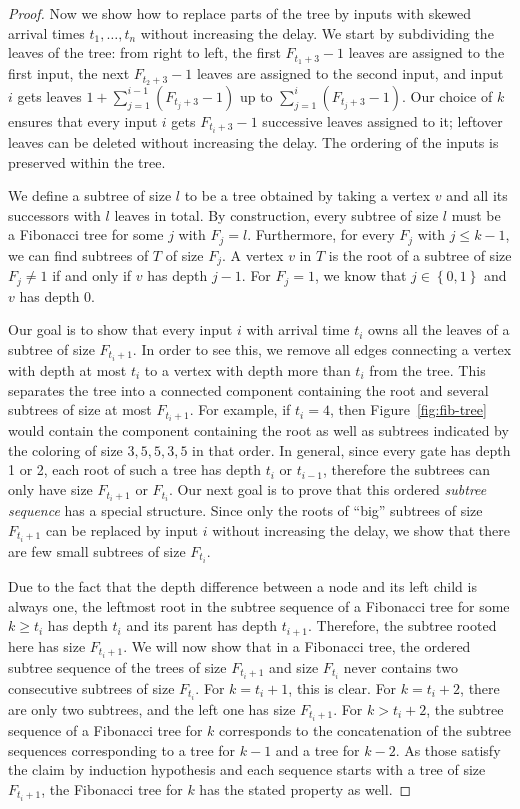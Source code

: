 \documentclass[11pt,final,microtype]{scrartcl}
\theoremstyle{plain}
\theoremstyle{definition}
\theoremstyle{remark}
\newcommand{\sset}[1]{\left\{#1\right\}}
\begin{document}
\begin{proof}
  Now we show how to replace parts of the tree by inputs with skewed
  arrival times $t_1, \dots, t_n$ without increasing the delay. We
  start by subdividing the leaves of the tree: from right to left, the
  first $F_{t_1+3}-1$ leaves are assigned to the first input, the next
  $F_{t_2+3}-1$ leaves are assigned to the second input, and input $i$
  gets leaves $1+\sum_{j=1}^{i-1} (F_{t_j+3} -1)$ up to $\sum_{j=1}^i
  (F_{t_j +3} -1)$. Our choice of $k$ ensures that every input $i$
  gets $F_{t_i +3}-1$ successive leaves assigned to it; leftover
  leaves can be deleted without increasing the delay. The ordering of
  the inputs is preserved within the tree.

  We define a subtree of size $l$ to be a tree obtained by taking a
  vertex $v$ and all its successors with $l$ leaves in total. By
  construction, every subtree of size $l$ must be a Fibonacci tree for
  some $j$ with $F_j = l$. Furthermore, for every $F_j$ with $j \leq
  k-1$, we can find subtrees of $T$ of size $F_j$. A vertex $v$ in $T$
  is the root of a subtree of size $F_j \neq 1$ if and only if $v$ has
  depth $j-1$. For $F_j = 1$, we know that $j \in \sset{0,1}$ and $v$
  has depth $0$.

  Our goal is to show that every input $i$ with arrival time $t_i$
  owns all the leaves of a subtree of size $F_{t_i+1}$. In order to
  see this, we remove all edges connecting a vertex with depth at most
  $t_i$ to a vertex with depth more than $t_i$ from the tree. This
  separates the tree into a connected component containing the root
  and several subtrees of size at most $F_{t_i+1}$. For example, if
  $t_i = 4$, then Figure~\ref{fig:fib-tree} would contain the
  component containing the root as well as subtrees indicated by the
  coloring of size $3,5,5,3,5$ in that order. In general, since every
  gate has depth 1 or 2, each root of such a tree has depth $t_i$ or
  $t_{i-1}$, therefore the subtrees can only have size $F_{t_i + 1}$
  or $F_{t_i}$. Our next goal is to prove that this ordered
  \emph{subtree sequence} has a special structure. Since only the
  roots of ``big'' subtrees of size $F_{t_i+1}$ can be replaced by
  input $i$ without increasing the delay, we show that there are few
  small subtrees of size $F_{t_i}$.

  Due to the fact that the depth difference between a node and its
  left child is always one, the leftmost root in the subtree sequence
  of a Fibonacci tree for some $k \geq t_i$ has depth $t_i$ and its
  parent has depth $t_{i+1}$. Therefore, the subtree rooted here has
  size $F_{t_i+1}$. We will now show that in a Fibonacci tree, the
  ordered subtree sequence of the trees of size $F_{t_i+1}$ and size
  $F_{t_i}$ never contains two consecutive subtrees of size
  $F_{t_i}$. For $k = t_i + 1$, this is clear. For $k = t_i + 2$,
  there are only two subtrees, and the left one has size
  $F_{t_i+1}$. For $k>t_i + 2$, the subtree sequence of a Fibonacci
  tree for $k$ corresponds to the concatenation of the subtree
  sequences corresponding to a tree for $k-1$ and a tree for $k-2$. As
  those satisfy the claim by induction hypothesis and each sequence
  starts with a tree of size $F_{t_i + 1}$, the Fibonacci tree for $k$
  has the stated property as well.


\end{proof}
\end{document}
